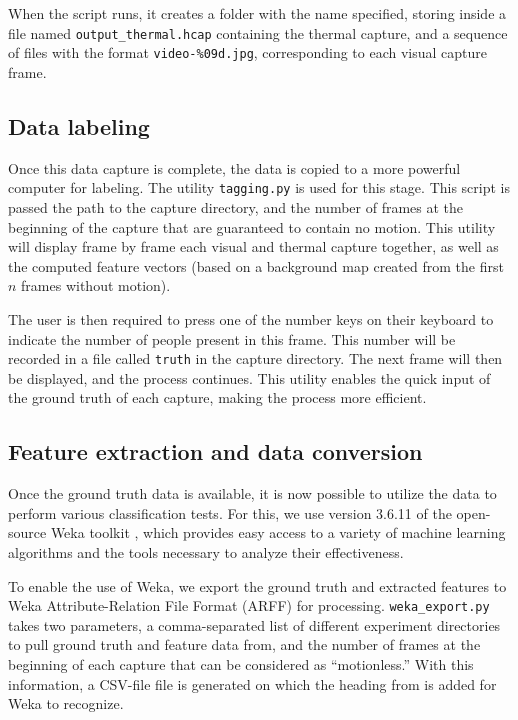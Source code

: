 \documentclass[../thesis/thesis.tex]{subfiles}
\begin{document}
When the script runs, it creates a folder with the name specified, storing inside a file named \texttt{output\_thermal.hcap} containing the thermal capture, and a sequence of files with the format \texttt{video-\%09d.jpg}, corresponding to each visual capture frame.

\subsection{Data labeling}
Once this data capture is complete, the data is copied to a more powerful computer for labeling. The utility \texttt{tagging.py} is used for this stage. This script is passed the path to the capture directory, and the number of frames at the beginning of the capture that are guaranteed to contain no motion. This utility will display frame by frame each visual and thermal capture together, as well as the computed feature vectors (based on a background map created from the first $n$ frames without motion).

The user is then required to press one of the number keys on their keyboard to indicate the number of people present in this frame. This number will be recorded in a file called \texttt{truth} in the capture directory. The next frame will then be displayed, and the process continues. This utility enables the quick input of the ground truth of each capture, making the process more efficient.

\subsection{Feature extraction and data conversion}
Once the ground truth data is available, it is now possible to utilize the data to perform various classification tests. For this, we use version 3.6.11 of the open-source Weka toolkit \cite{Weka}, which provides easy access to a variety of machine learning algorithms and the tools necessary to analyze their effectiveness.

To enable the use of Weka, we export the ground truth and extracted features to Weka Attribute-Relation File Format (ARFF) for processing. \texttt{weka\_export.py} takes two parameters, a comma-separated list of different experiment directories to pull ground truth and feature data from, and the number of frames at the beginning of each capture that can be considered as ``motionless.'' With this information, a CSV-file file is generated on which the heading from  is added for Weka to recognize.
\end{document}
